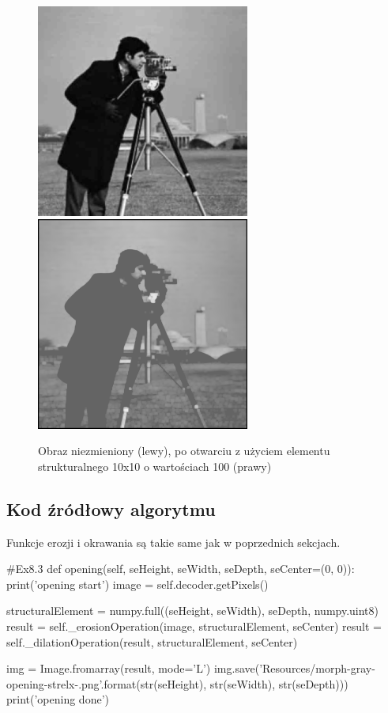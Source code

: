 \documentclass[a4paper,12pt]{book}
\begin{document}
\begin{figure}[H]
	\caption{Obraz niezmieniony (lewy), po otwarciu z użyciem elementu strukturalnego 10x10 o wartościach 100 (prawy)}
	\includegraphics[width=7cm, height=7cm]{man-unmodified.jpg}
	\includegraphics[width=7cm, height=7cm]{morph-gray-opening-strel10x10-100.png}
\end{figure}
\subsection{Kod źródłowy algorytmu}
Funkcje erozji i okrawania są takie same jak w poprzednich sekcjach. 
\begin{python}
#Ex8.3
def opening(self, seHeight, seWidth, seDepth, seCenter=(0, 0)):
	print('opening start')
	image = self.decoder.getPixels()
	
	structuralElement = numpy.full((seHeight, seWidth), seDepth, numpy.uint8)
	result = self._erosionOperation(image, structuralElement, seCenter)
	result = self._dilationOperation(result, structuralElement, seCenter)
	
	img = Image.fromarray(result, mode='L')
	img.save('Resources/morph-gray-opening-strel{}x{}-{}.png'.format(str(seHeight), str(seWidth), str(seDepth)))
	print('opening done')
\end{python}
\end{document}
